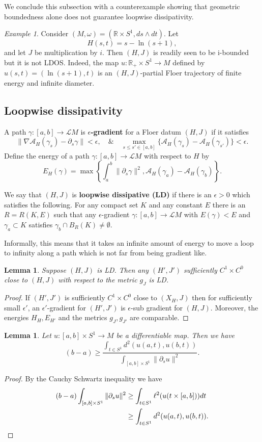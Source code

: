 \documentclass[11pt]{amsart}
\newcommand{\R}{\mathbb{R}}
\newtheorem{lm}[tm]{Lemma}
\theoremstyle{definition}
\theoremstyle{remark}
\newtheorem{ex}[tm]{Example}
\begin{document}
We conclude this subsection with a counterexample showing that geometric boundedness alone does not guarantee loopwise dissipativity.
\begin{ex}\label{ExDegAtInfty}
Consider $(M,\omega)=(\R\times S^1,ds\wedge dt)$. Let
\[
H(s,t)=s-\ln (s+1),
\]
and let $J$ be multiplication by $i$. Then $(H,J)$ is readily seen to be i-bounded but it is not LDOS. Indeed, the map $u:\R_+\times S^1\to M$ defined by $u(s,t)=(\ln (s+1),t)$ is an $(H,J)$-partial Floer trajectory of finite energy and infinite diameter.
\end{ex}


\subsection{Loopwise dissipativity}
A path $\gamma:[a,b]\to\mathcal{L}M$ is \textbf{$\epsilon$-gradient} for a Floer datum $(H,J)$ if it satisfies
\[
\|\nabla\mathcal{A}_H(\gamma_s)-\partial_s\gamma\|<\epsilon,\quad \& \quad \max_{s\leq s'\in[a,b]}\{\mathcal{A}_H(\gamma_s)-\mathcal{A}_H(\gamma_{s'})\}<\epsilon.
\]
Define the energy of a path $\gamma:[a,b]\to\mathcal{L}M$ with respect to $H$ by
\[
E_H(\gamma)=\max\left\{\int_a^b\|\partial_s\gamma\|^2,\mathcal{A}_{H}(\gamma_a)-\mathcal{A}_H(\gamma_b)\right\}.
\]

We say that $(H,J)$ is \textbf{loopwise dissipative (LD)} if there is an $\epsilon>0$ which satisfies the following. For any compact set $K$ and any constant $E$ there is an $R=R(K,E)$ such that any $\epsilon$-gradient $\gamma:[a,b]\to\mathcal{L}M$ with $E(\gamma)<E$ and $\gamma_a\subset K$ satisfies $\gamma_b\cap B_R(K)\neq\emptyset$.

Informally, this means that it takes an infinite amount of energy to move a loop to infinity along a path which is not far from being gradient like.

\begin{lm}\label{lmWeakDisOp}
Suppose $(H,J)$ is LD. Then any $(H',J')$ sufficiently $C^1\times C^0$ close to $(H,J)$ with respect to the metric $g_J$ is LD.
\end{lm}
\begin{proof}
If $(H',J')$ is sufficiently $C^1\times C^0$ close to $(X_H,J)$ then for sufficiently small $\epsilon'$, an $\epsilon'$-gradient for $(H',J')$ is $\epsilon$-sub gradient for $(H,J)$. Moreover, the energies $H_H,E_{H'}$ and the metrics $g_J,g_{J'}$ are comparable.
\end{proof}


\begin{lm}\label{lmModBd}
Let $u:[a,b]\times S^1\to M$ be a differentiable map. Then we have
\[
(b-a)\geq\frac{\int_{t\in S^1}d^2(u(a,t),u(b,t))}{\int_{[a,b]\times S^1}\|\partial_su\|^2}.
\]
\end{lm}
\begin{proof}
By the Cauchy Schwartz inequality we have
\begin{align}
(b-a)\int_{[a,b]\times S^1}\|\partial_su\|^2&\geq \int_{t\in S^1}\ell^2(u(t\times [a,b]))dt\notag\\
&\geq \int_{t\in S^1}d^2(u(a,t),u(b,t))\notag.
\end{align}
\end{proof}
\end{document}
